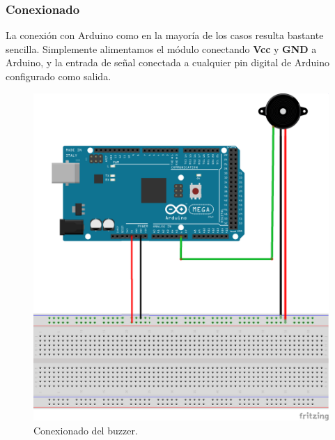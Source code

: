 \subsubsection{Conexionado}

La conexión con Arduino como en la mayoría de los casos resulta bastante sencilla. Simplemente alimentamos el módulo conectando \textbf{Vcc} y \textbf{GND} a Arduino, y la entrada
de señal conectada a cualquier pin digital de Arduino configurado como salida.\\

 \begin{figure}[H]
  \begin{center}
    \includegraphics[scale=0.6]{imagenes/conexionado_buzzer.png}
  \end{center}
  \caption{Conexionado del buzzer.}
  \label{figura:pines_sharp}
\end{figure}



